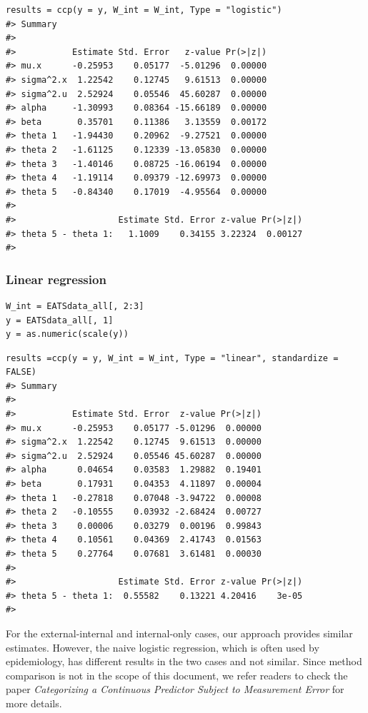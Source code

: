 \documentclass[15 pt,]{article}
\begin{document}
\begin{verbatim}
results = ccp(y = y, W_int = W_int, Type = "logistic")
#> Summary 
#>   
#>           Estimate Std. Error   z-value Pr(>|z|)
#> mu.x      -0.25953    0.05177  -5.01296  0.00000
#> sigma^2.x  1.22542    0.12745   9.61513  0.00000
#> sigma^2.u  2.52924    0.05546  45.60287  0.00000
#> alpha     -1.30993    0.08364 -15.66189  0.00000
#> beta       0.35701    0.11386   3.13559  0.00172
#> theta 1   -1.94430    0.20962  -9.27521  0.00000
#> theta 2   -1.61125    0.12339 -13.05830  0.00000
#> theta 3   -1.40146    0.08725 -16.06194  0.00000
#> theta 4   -1.19114    0.09379 -12.69973  0.00000
#> theta 5   -0.84340    0.17019  -4.95564  0.00000
#>   
#>                    Estimate Std. Error z-value Pr(>|z|)
#> theta 5 - theta 1:   1.1009    0.34155 3.22324  0.00127
#> 
\end{verbatim}

\subsubsection{Linear regression}\label{linear-regression-2}

\begin{verbatim}
W_int = EATSdata_all[, 2:3]
y = EATSdata_all[, 1]
y = as.numeric(scale(y))
\end{verbatim}

\begin{verbatim}
results =ccp(y = y, W_int = W_int, Type = "linear", standardize = FALSE)
#> Summary 
#>   
#>           Estimate Std. Error  z-value Pr(>|z|)
#> mu.x      -0.25953    0.05177 -5.01296  0.00000
#> sigma^2.x  1.22542    0.12745  9.61513  0.00000
#> sigma^2.u  2.52924    0.05546 45.60287  0.00000
#> alpha      0.04654    0.03583  1.29882  0.19401
#> beta       0.17931    0.04353  4.11897  0.00004
#> theta 1   -0.27818    0.07048 -3.94722  0.00008
#> theta 2   -0.10555    0.03932 -2.68424  0.00727
#> theta 3    0.00006    0.03279  0.00196  0.99843
#> theta 4    0.10561    0.04369  2.41743  0.01563
#> theta 5    0.27764    0.07681  3.61481  0.00030
#>   
#>                    Estimate Std. Error z-value Pr(>|z|)
#> theta 5 - theta 1:  0.55582    0.13221 4.20416    3e-05
#> 
\end{verbatim}

For the external-internal and internal-only cases, our approach provides
similar estimates. However, the naive logistic regression, which is
often used by epidemiology, has different results in the two cases and
not similar. Since method comparison is not in the scope of this
document, we refer readers to check the paper \emph{Categorizing a
Continuous Predictor Subject to Measurement Error} for more details.
\end{document}
